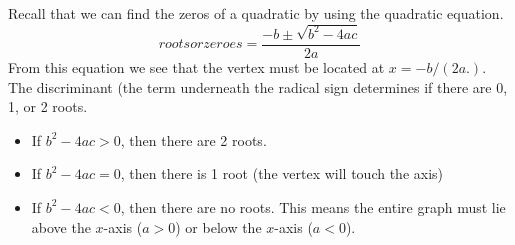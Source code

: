\documentclass[10pt,]{book}
\theoremstyle{plain}
\theoremstyle{definition}
\theoremstyle{definition}
\newcommand{\lt}{ < }
\begin{document}
Recall that we can find the zeros of a quadratic by using the quadratic equation.
\begin{equation*}roots or zeroes  =  
\frac{-b\pm\sqrt{b^2-4ac}}{2a}\end{equation*}
From this equation we see that the vertex must be located at \(x= -b/(2a.)\). The discriminant (the term underneath the radical sign determines if there are 0, 1, or 2 roots.%
\leavevmode%
\begin{itemize}[label=\textbullet]
\item{}If \(b^2-4ac>0\), then there are 2 roots.%
\item{}If \(b^2-4ac=0\), then there is 1 root (the vertex will touch the axis)%
\item{}If \(b^2-4ac\lt 0\), then there are no roots. This means the entire graph must lie above the \(x\)-axis (\(a > 0\)) or below the \(x\)-axis (\(a \lt 0\)).%
\end{itemize}
\par
\end{document}
